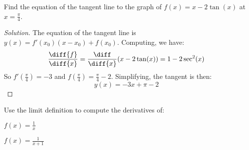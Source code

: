 \documentclass[crop=false,class=article,oneside]{standalone}
\begin{document}
            \begin{problem}
                Find the equation of the tangent line
                to the graph of $f(x)=x-2\tan(x)$
                at $x=\frac{\pi}{4}$.
            \end{problem}
            \begin{proof}[Solution]
                The equation of the tangent line is
                $y(x)=f'(x_{0})(x-x_{0})+f(x_{0})$.
                Computing, we have:
                \begin{equation*}
                    \frac{\diff{f}}{\diff{x}}
                    =\frac{\diff}{\diff{x}}(x-2\tan(x))
                    =1-2\sec^{2}(x)    
                \end{equation*}
                So $f'(\frac{\pi}{4})=-3$ and
                $f(\frac{\pi}{4})=\frac{\pi}{4}-2$.
                Simplifying, the tangent is then:
                \begin{equation*}
                    y(x)=-3x+\pi-2
                \end{equation*}
            \end{proof}
            \begin{problem}
                Use the limit definition to compute
                the derivatives of:
                \begin{enumerate}[label=(\alph*)]
                    \begin{multicols}{2}
                        \item $f(x)=\frac{1}{x}$
                        \item $f(x)=\frac{1}{x+1}$
                    \end{multicols}
                \end{enumerate}
            \end{problem}
\end{document}
